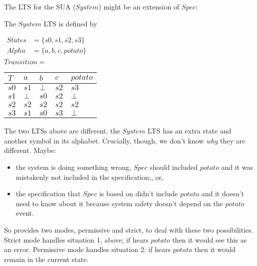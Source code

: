 \documentclass[12pt,a4paper]{article}
\begin{document}
The LTS for the SUA ($System$) might be an extension of $Spec$: 
\begin{center}
\end{center}
\noindent The $System$ LTS is defined by\\
\begin{center}
$\begin{array}{ll}
States &= \{ s0, s1, s2, s3 \} \\
Alpha &= \{a, b, c, potato\} \\
\end{array} 
$
\\
$Transition = $
\begin{tabular}{l|l|l|l|l}
$T$  &  $a$ & $b$ & $c$ & $potato$\\
\hline
$s0$ & $s1$ & $\bot$ & $s2$ & $s3$\\
$s1$ & $\bot$ & $s0$ & $s2$ & $\bot$\\ 
$s2$ & $s2$ & $s2$ &$s2$ & $s2$\\
$s3$ & $s1$ & $s0$ & $s3$ & $\bot$
\end{tabular}
\end{center}

The two LTSs above are different, the $System$ LTS has an extra state and another symbol in its alphabet. Crucially, though, we don't know \textit{why} they are different.
Maybe:
\begin{itemize}
\item the system is doing something wrong, $Spec$ should included $potato$ and it was mistakenly not included in the specification;, or,
\item the specification that $Spec$ is based on didn't include $potato$ and it doesn't need to know about it because system safety doesn't depend on the $potato$ event.
\end{itemize}
So \Varanus provides two modes, permissive and strict, to deal with these two possibilities.  Strict mode handles situation 1, above; if \Varanus hears $potato$ then it would see this as an error. 
Permissive mode handles situation 2: if \Varanus hears $potato$ then it would remain in the current state.
\end{document}
